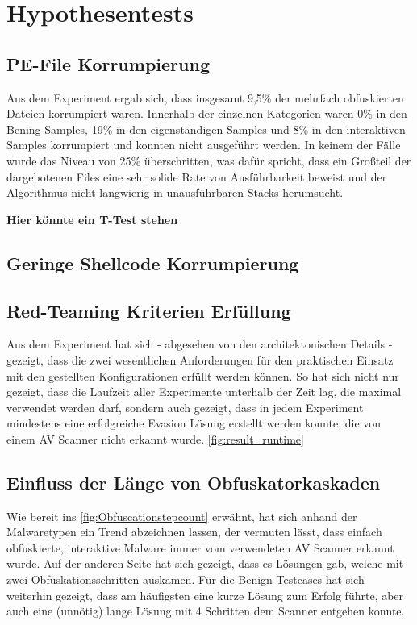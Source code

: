 \section{Hypothesentests}
\subsection{PE-File Korrumpierung}
Aus dem Experiment ergab sich, dass insgesamt 9,5\% der mehrfach obfuskierten Dateien korrumpiert waren. Innerhalb der einzelnen Kategorien waren 0\% in den Bening Samples, 19\% in den eigenständigen Samples und 8\% in den interaktiven Samples korrumpiert und konnten nicht ausgeführt werden.
In keinem der Fälle wurde das Niveau von 25\% überschritten, was dafür spricht, dass ein Großteil der dargebotenen Files eine sehr solide Rate von Ausführbarkeit beweist und der Algorithmus nicht langwierig in unausführbaren Stacks herumsucht.

\textbf{Hier könnte ein T-Test stehen}

\subsection{Geringe Shellcode Korrumpierung}
% 


\subsection{Red-Teaming Kriterien Erfüllung}
Aus dem Experiment hat sich - abgesehen von den architektonischen Details - gezeigt, dass die zwei wesentlichen Anforderungen für den praktischen Einsatz mit den gestellten Konfigurationen erfüllt werden können.
So hat sich nicht nur gezeigt, dass die Laufzeit aller Experimente unterhalb der Zeit lag, die maximal verwendet werden darf, sondern auch gezeigt, dass in jedem Experiment mindestens eine erfolgreiche Evasion Lösung erstellt werden konnte, die von einem AV Scanner nicht erkannt wurde.
\ref{fig:result_runtime}

\subsection{Einfluss der Länge von Obfuskatorkaskaden}
Wie bereit ins \ref{fig:Obfuscationstepcount} erwähnt, hat sich anhand der Malwaretypen ein Trend abzeichnen lassen, der vermuten lässt, dass einfach obfuskierte, interaktive Malware immer vom verwendeten AV Scanner erkannt wurde. Auf der anderen Seite hat sich gezeigt, dass es Lösungen gab, welche mit zwei Obfuskationsschritten auskamen. Für die Benign-Testcases hat sich weiterhin gezeigt, dass am häufigsten eine kurze Lösung zum Erfolg führte, aber auch eine (unnötig) lange Lösung mit 4 Schritten dem Scanner entgehen konnte.
